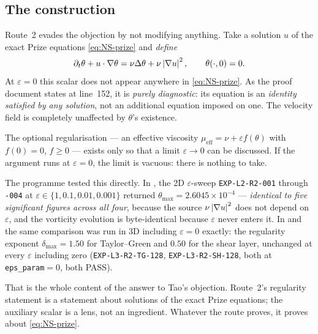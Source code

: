 \subsection{The construction}

Route~2 evades the objection by not modifying anything. Take a solution
\(u\) of the exact Prize equations \eqref{eq:NS-prize} and \emph{define}
\begin{equation}\label{eq:theta-def}
  \partial_t\theta + u\cdot\nabla\theta
    = \nu\Delta\theta + \nu\left|\nabla u\right|^2,
  \qquad \theta(\cdot,0)=0 .
\end{equation}
At \(\varepsilon=0\) this scalar does not appear anywhere in
\eqref{eq:NS-prize}. As the proof document states at line~152, it is
\emph{purely diagnostic}: its equation is an \emph{identity satisfied by any
solution}, not an additional equation imposed on one. The velocity field is
completely unaffected by \(\theta\)'s existence.

The optional regularisation --- an effective viscosity
\(\mu_{\mathrm{eff}}=\nu+\varepsilon f(\theta)\) with \(f(0)=0\), \(f\ge0\)
--- exists only so that a limit \(\varepsilon\to0\) can be discussed. If the
argument runs at \(\varepsilon=0\), the limit is vacuous: there is nothing to
take.

\begin{obsv}
\label{obs:eps-vacuous}
The programme tested this directly. In , the 2D \(\varepsilon\)-sweep
\texttt{EXP-L2-R2-001} through \texttt{-004} at
\(\varepsilon\in\{1,0.1,0.01,0.001\}\) returned
\(\theta_{\max}=2.6045\times10^{-4}\) --- \emph{identical to five significant
figures across all four}, because the source \(\nu\left|\nabla u\right|^2\) does not
depend on \(\varepsilon\), and the vorticity evolution is byte-identical
because \(\varepsilon\) never enters it. In  and  the same
comparison was run in 3D including \(\varepsilon=0\) exactly: the regularity
exponent \(\delta_{\max}=1.50\) for Taylor--Green and \(0.50\) for the shear
layer, unchanged at every \(\varepsilon\) including zero
(\texttt{EXP-L3-R2-TG-128}, \texttt{EXP-L3-R2-SH-128}, both at
\texttt{eps\_param}\(=0\), both \textsf{PASS}).
\end{obsv}

That is the whole content of the answer to Tao's objection. Route~2's
regularity statement is a statement about solutions of the exact Prize
equations; the auxiliary scalar is a lens, not an ingredient. Whatever the
route proves, it proves about \eqref{eq:NS-prize}.

